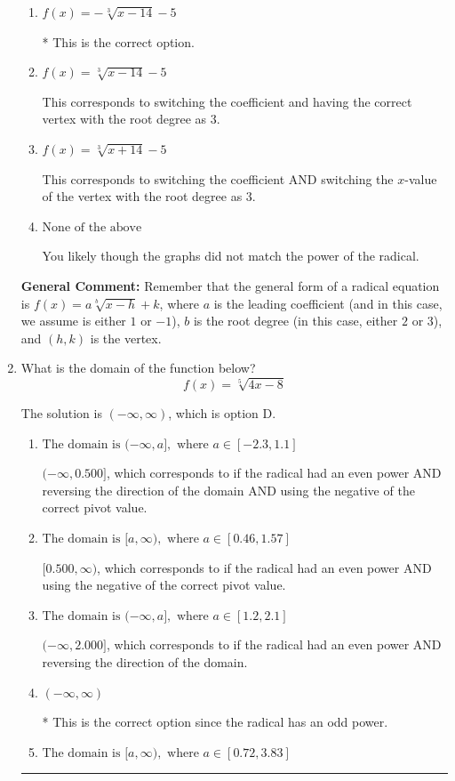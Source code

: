 \documentclass{extbook}[14pt]
\newcommand{\litem}[1]{\item #1

\rule{\textwidth}{0.4pt}}
\begin{document}
\begin{enumerate}
{\begin{enumerate}[label=\Alph*.]
This corresponds to the correct coefficient and switching the $x$-value of the vertex with the root degree as $3$.
\item \( f(x) = - \sqrt[3]{x - 14} - 5 \)

* This is the correct option.
\item \( f(x) = \sqrt[3]{x - 14} - 5 \)

This corresponds to switching the coefficient and having the correct vertex with the root degree as $3$.
\item \( f(x) = \sqrt[3]{x + 14} - 5 \)

This corresponds to switching the coefficient AND switching the $x$-value of the vertex with the root degree as $3$.
\item \( \text{None of the above} \)

You likely though the graphs did not match the power of the radical.
\end{enumerate}

\textbf{General Comment:} Remember that the general form of a radical equation is $ f(x) = a \sqrt[b]{x - h} + k$, where $a$ is the leading coefficient (and in this case, we assume is either $1$ or $-1$), $b$ is the root degree (in this case, either $2$ or $3$), and $(h, k)$ is the vertex.
}
\litem{
What is the domain of the function below?
\[ f(x) = \sqrt[5]{4 x - 8} \]

The solution is \( (-\infty, \infty) \), which is option D.\begin{enumerate}[label=\Alph*.]
\item \( \text{The domain is } (-\infty, a], \text{   where } a \in [-2.3, 1.1] \)

$(-\infty, 0.500]$, which corresponds to if the radical had an even power AND reversing the direction of the domain AND using the negative of the correct pivot value.
\item \( \text{The domain is } [a, \infty), \text{   where } a \in [0.46, 1.57] \)

$[0.500, \infty)$, which corresponds to if the radical had an even power AND using the negative of the correct pivot value.
\item \( \text{The domain is } (-\infty, a], \text{   where } a \in [1.2, 2.1] \)

$(-\infty, 2.000]$, which corresponds to if the radical had an even power AND reversing the direction of the domain.
\item \( (-\infty, \infty) \)

* This is the correct option since the radical has an odd power.
\item \( \text{The domain is } [a, \infty), \text{   where } a \in [0.72, 3.83] \)


\end{enumerate}}
\end{enumerate}
\end{document}
